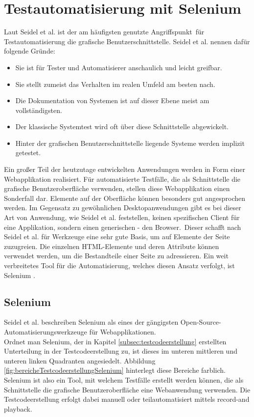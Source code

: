 \chapter{Testautomatisierung mit Selenium}
\label{sec:testautomatisierung_mit_selenium}

Laut Seidel et al. \cite[vgl. S. 48]{seidl_basiswissen_2012} ist der am häufigsten genutzte \frqq Angriffspunkt\flqq\ für Testautomatisierung die grafische Benutzerschnittstelle. Seidel et al. \cite[S. 48]{seidl_basiswissen_2012} nennen dafür folgende Gründe:
\begin{itemize}
\item \glqq Sie ist für Tester und Automatisierer anschaulich und leicht greifbar.\grqq
\item \glqq Sie stellt zumeist das Verhalten im realen Umfeld am besten nach.\grqq
\item \glqq Die Dokumentation von Systemen ist auf dieser Ebene meist am vollständigsten.\grqq
\item \glqq Der klassische Systemtest wird oft über diese Schnittstelle abgewickelt.\grqq
\item \glqq Hinter der grafischen Benutzerschnittstelle liegende Systeme werden implizit getestet.\grqq
\end{itemize}
Ein großer Teil der heutzutage entwickelten Anwendungen werden in Form einer Webapplikation realisiert. Für automatisierte Testfälle, die als Schnittstelle die grafische Benutzeroberfläche verwenden, stellen diese Webapplikation einen Sonderfall dar. Elemente auf der Oberfläche können besonders gut angesprochen werden.
Im Gegensatz zu gewöhnlichen Desktopanwendungen gibt es bei dieser Art von Anwendung, wie Seidel et al. \cite[vgl. S. 88]{seidl_basiswissen_2012} feststellen, \glqq keinen spezifischen Client für eine Applikation, sondern einen generischen - den Browser.\grqq\ Dieser schafft nach Seidel et al.  \cite[vgl. S. 59]{seidl_basiswissen_2012} für Werkzeuge eine sehr  gute Basis, um auf Elemente der Seite zuzugreien. Die einzelnen HTML-Elemente und deren Attribute können verwendet werden, um die Bestandteile einer Seite zu adressieren.
Ein weit verbreitetes Tool für die Automatisierung, welches diesen Ansatz verfolgt, ist Selenium \cite{selenium_selenium_2015}.
\section{Selenium}
\label{sec:selenium}
Seidel et al. \cite[S. 142]{seidl_basiswissen_2012} beschreiben Selenium als \glqq eines der gängigsten Open-Source-Automatisierungswerkzeuge für Webapplikationen.\grqq\\
Ordnet man Selenium, der in Kapitel \ref{subsec:testcodeerstellung} erstellten Unterteilung in der Testcodeerstellung zu, ist dieses im unteren mittleren und unteren linken Quadranten angesiedelt. Abbildung \ref{fig:bereicheTestcodeerstellungSelenium} hinterlegt diese Bereiche farblich.
Selenium ist also ein Tool, mit welchem Testfälle erstellt werden können, die als Schnittstelle die grafische Benutzeroberfläche eine Webanwendung verwenden. Die Testcodeerstellung erfolgt dabei manuell oder teilautomatisiert mittels \grq record-and playback\grq.\\

